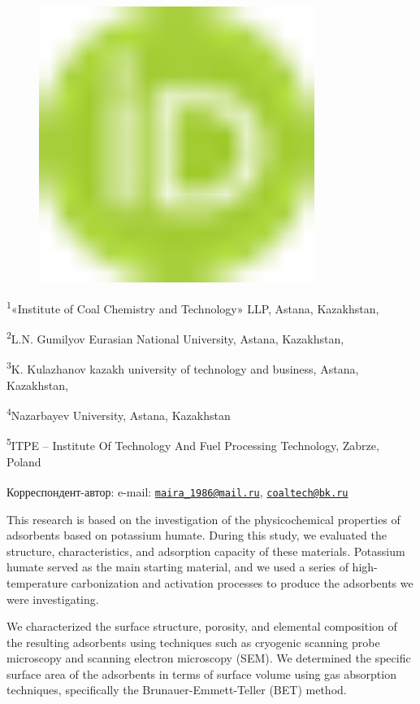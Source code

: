 \begin{figure}[H]
	\centering
	\includegraphics[width=0.8\textwidth]{media/chem2/image1}
	\caption*{}
\end{figure}


\textsuperscript{1}«Institute of Coal Chemistry and Technology» LLP,
Astana, Kazakhstan,

\textsuperscript{2}L.N. Gumilyov Eurasian National University,
Astana, Kazakhstan,

\textsuperscript{3}K. Kulazhanov kazakh university of technology and
business, Astana, Kazakhstan,

\textsuperscript{4}Nazarbayev University, Astana, Kazakhstan

\textsuperscript{5}ITPE -- Institute Of Technology And Fuel Processing
Technology, Zabrze, Poland

{\bfseries \textsuperscript{\envelope }}Корреспондент-автор: e-mail:
\href{mailto:maira_1986@mail.ru}{\nolinkurl{maira\_1986@mail.ru}},
\href{mailto:coaltech@bk.ru}{\nolinkurl{coaltech@bk.ru}}

This research is based on the investigation of the physicochemical
properties of adsorbents based on potassium humate. During this study,
we evaluated the structure, characteristics, and adsorption capacity of
these materials. Potassium humate served as the main starting material,
and we used a series of high-temperature carbonization and activation
processes to produce the adsorbents we were investigating.

We characterized the surface structure, porosity, and elemental
composition of the resulting adsorbents using techniques such as
cryogenic scanning probe microscopy and scanning electron microscopy
(SEM). We determined the specific surface area of the adsorbents in
terms of surface volume using gas absorption techniques, specifically
the Brunauer-Emmett-Teller (BET) method.

